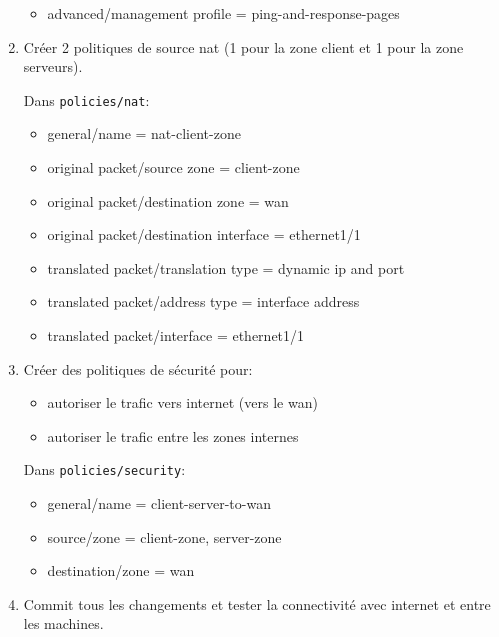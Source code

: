 \documentclass[a4paper]{article}
\begin{document}
\begin{enumerate}
\begin{example}
\begin{itemize}
            \item advanced/management profile = ping-and-response-pages
        \end{itemize}
    \end{example}
    \item Créer 2 politiques de source nat (1 pour la zone client et 1 pour la zone serveurs).
    \begin{example}
        Dans \texttt{policies/nat}:
        \begin{itemize}
            \item general/name = nat-client-zone
            \item original packet/source zone = client-zone
            \item original packet/destination zone = wan
            \item original packet/destination interface = ethernet1/1
            \item translated packet/translation type = dynamic ip and port
            \item translated packet/address type = interface address
            \item translated packet/interface = ethernet1/1
        \end{itemize}
    \end{example}
    \item Créer des politiques de sécurité pour:
    \begin{itemize}
        \item autoriser le trafic vers internet (vers le wan)
        \item autoriser le trafic entre les zones internes
    \end{itemize}
    \begin{example}
        Dans \texttt{policies/security}:
        \begin{itemize}
            \item general/name = client-server-to-wan
            \item source/zone = client-zone, server-zone
            \item destination/zone = wan
        \end{itemize}
    \end{example}
    \item Commit tous les changements et tester la connectivité avec internet et entre les machines.
\end{enumerate}
\end{document}
